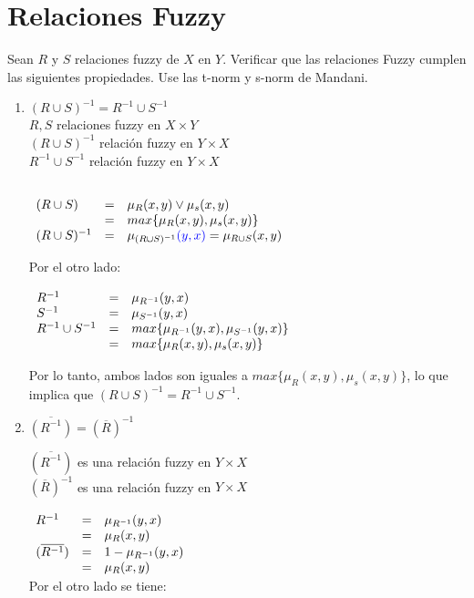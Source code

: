 \documentclass[letterpaper,spanish,11pt]{article}
\begin{document}
\section{Relaciones Fuzzy}
Sean $R$ y $S$ relaciones fuzzy de $X$ en $Y$. Verificar que las relaciones Fuzzy cumplen las siguientes propiedades. Use las t-norm y s-norm de Mandani.

\begin{enumerate}
\item $(R \cup S )^{-1} = R^{-1} \cup S^{-1}$\\
$R,S$ relaciones fuzzy en $X\times Y$\\
$(R\cup S)^{-1}$ relaci\'{o}n fuzzy en $Y\times X$\\
$R^{-1}\cup S^{-1}$ relaci\'{o}n fuzzy en $Y\times X$



$\begin{array}{l l l}\\
(R \cup S ) &= &\mu_{R}(x,y) \vee \mu_{s}(x,y)\\
 &= &max\{\mu_{R}(x,y),\mu_{s}(x,y)\}\\
(R \cup S )^{-1} &= & \mu_{(R\cup S)^{-1}}\textcolor{blue}{(y,x)} = \mu_{R\cup S}(x,y)\\
\end{array}$

Por el otro lado:\\

$\begin{array}{l l l}\\
R^{-1} &= &\mu_{R^{-1}}(y,x)\\
S^{-1} &= &\mu_{S^{-1}}(y,x)\\
R^{-1} \cup S^{-1}  &= &max\{\mu_{R^{-1}}(y,x),\mu_{S^{-1}}(y,x)\}\\
 &= & max\{\mu_{R}(x,y),\mu_{s}(x,y)\}
\end{array}$

Por lo tanto, ambos lados son iguales a $max\{\mu_{R}(x,y),\mu_{s}(x,y)\}$, lo
que implica que $(R \cup S )^{-1} = R^{-1} \cup S^{-1}$.

\item $\overline{(R^{-1})} = (\overline{R})^{-1}$


$(\overline{R^{-1}})$ es una relaci\'{o}n fuzzy en $Y\times X$\\
$(\overline{R})^{-1}$ es una relaci\'{o}n fuzzy en $Y\times X$\\

$\begin{array}{l l l }\\
 R^{-1} &= &\mu_{R^{-1}}(y,x)\\
 &= &\mu_{R}(x,y) \\
(\overline{R^{-1}}) &= & 1- \mu_{R^{-1}}(y,x) \\
 &= & \mu_{R}(x,y)\\
\end{array}$\\
Por el otro lado se tiene:


\end{enumerate}
\end{document}
